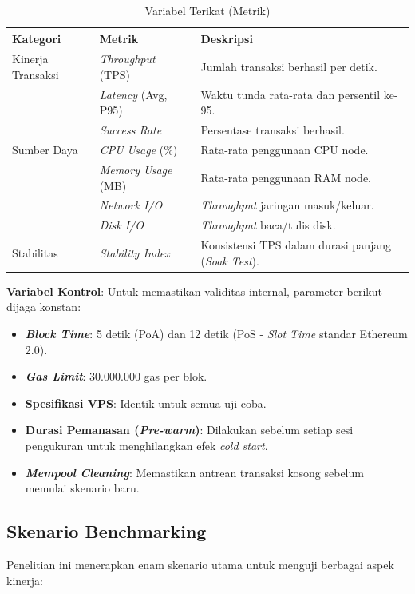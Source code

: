 \begin{longtable}{|>{\raggedright\arraybackslash}p{4cm}|>{\raggedright\arraybackslash}p{4cm}|>{\raggedright\arraybackslash}p{7cm}|}
\caption{Variabel Terikat (Metrik)} \label{tab:variabel_terikat} \\
\hline
\textbf{Kategori} & \textbf{Metrik} & \textbf{Deskripsi} \\
\hline
\endfirsthead
\hline
\endhead
\hline
\endlastfoot

Kinerja Transaksi & \textit{Throughput} (TPS) & Jumlah transaksi berhasil per detik. \\
& \textit{Latency} (Avg, P95) & Waktu tunda rata-rata dan persentil ke-95. \\
& \textit{Success Rate} & Persentase transaksi berhasil. \\
\hline
Sumber Daya & \textit{CPU Usage} (\%) & Rata-rata penggunaan CPU node. \\
& \textit{Memory Usage} (MB) & Rata-rata penggunaan RAM node. \\
& \textit{Network I/O} & \textit{Throughput} jaringan masuk/keluar. \\
& \textit{Disk I/O} & \textit{Throughput} baca/tulis disk. \\
\hline
Stabilitas & \textit{Stability Index} & Konsistensi TPS dalam durasi panjang (\textit{Soak Test}). \\
\hline
\end{longtable}

\textbf{Variabel Kontrol}:
Untuk memastikan validitas internal, parameter berikut dijaga konstan:
\begin{itemize}
    \item \textbf{\textit{Block Time}}: 5 detik (PoA) dan 12 detik (PoS - \textit{Slot Time} standar Ethereum 2.0). 
    \item \textbf{\textit{Gas Limit}}: 30.000.000 gas per blok.
    \item \textbf{Spesifikasi VPS}: Identik untuk semua uji coba.
    \item \textbf{Durasi Pemanasan (\textit{Pre-warm})}: Dilakukan sebelum setiap sesi pengukuran untuk menghilangkan efek \textit{cold start}.
    \item \textbf{\textit{Mempool Cleaning}}: Memastikan antrean transaksi kosong sebelum memulai skenario baru.
\end{itemize}

\subsection{Skenario Benchmarking}
Penelitian ini menerapkan enam skenario utama untuk menguji berbagai aspek kinerja:

